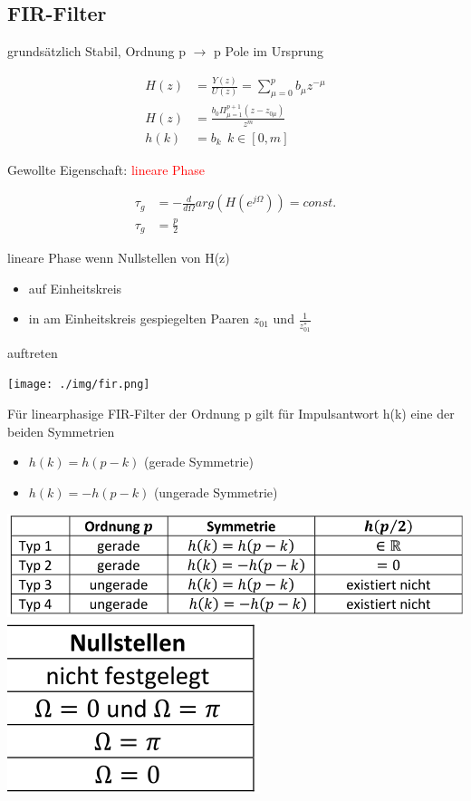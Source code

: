 \documentclass[10pt,a4paper]{article}
\begin{document}
\subsection{FIR-Filter}
grundsätzlich Stabil, Ordnung p $\rightarrow$ p Pole im Ursprung
  \begin{mdframed}[style=exercise]
    \begin{align}
        H(z)&=\frac{Y(z)}{U(z)}= \sum_{\mu=0}^{p} b_\mu z^{-\mu} \\
        H(z)&=\frac{b_0\Pi_{\mu=1}^{p+1}(z-z_{0\mu})}{z^m}\\
        h(k)&= b_k \ \ k\in[0,m] 
    \end{align}
  \end{mdframed}
Gewollte Eigenschaft: \textcolor{red}{lineare Phase}
  \begin{mdframed}[style=exercise]
    \begin{align}
        \tau_g &= -\frac{d}{d\Omega} arg(H(e^{j\Omega})) = const.\\
        \tau_g &= \frac{p}{2}
    \end{align}
  \end{mdframed}
lineare Phase wenn Nullstellen von H(z)
\begin{itemize}
    \item auf Einheitskreis
    \item in am Einheitskreis gespiegelten Paaren $z_{01}$ und $\frac{1}{z^*_{01}}$
\end{itemize}
auftreten
  \begin{center}
      \texttt{[image: ./img/fir.png]}
  \end{center}
Für linearphasige FIR-Filter der Ordnung p gilt für Impulsantwort h(k) eine der beiden Symmetrien
\begin{itemize}
    \item $h(k)= h(p-k)$ (gerade Symmetrie) 
    \item $h(k)= -h(p-k)$ (ungerade Symmetrie) 
\end{itemize}

\begin{center}
    \includegraphics[width=.35\textwidth]{./img/firtyp1.png}
    \includegraphics[width=.115\textwidth]{./img/firtyp2.png}
\end{center}
\end{document}
